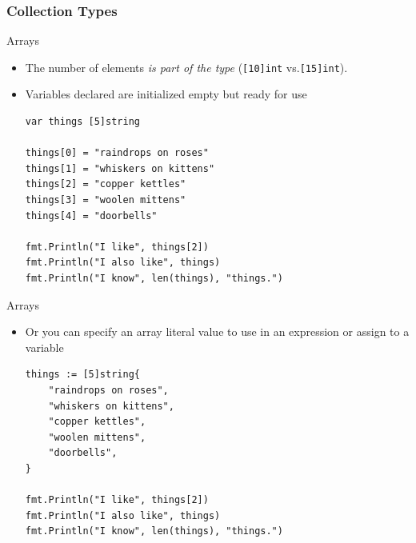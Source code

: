\documentclass[pdf]{beamer}
\newcommand\z[1]{\texttt{#1}}
\newcommand\keyword[1]{{\color{blue}\z{#1}}}
\begin{document}
\subsubsection{Collection Types}
\begin{frame}[fragile]{Arrays}
	\begin{itemize}
		\item The number of elements \emph{is part of the type} (\z{[10]}\keyword{int} vs.\@ \z{[15]}\keyword{int}).
			\pause
		\item Variables declared are initialized empty but ready for use
\begin{lstlisting}
var things [5]string

things[0] = "raindrops on roses"
things[1] = "whiskers on kittens"
things[2] = "copper kettles"
things[3] = "woolen mittens"
things[4] = "doorbells"

fmt.Println("I like", things[2])
fmt.Println("I also like", things)
fmt.Println("I know", len(things), "things.")
\end{lstlisting}
	\end{itemize}
\end{frame}

\begin{frame}[fragile]{Arrays}
	\begin{itemize}
		\item Or you can specify an array literal value to use in an expression or assign to a variable
\begin{lstlisting}
things := [5]string{
    "raindrops on roses",
    "whiskers on kittens",
    "copper kettles",
    "woolen mittens",
    "doorbells",
}

fmt.Println("I like", things[2])
fmt.Println("I also like", things)
fmt.Println("I know", len(things), "things.")
\end{lstlisting}
	\end{itemize}
\end{frame}
\end{document}
